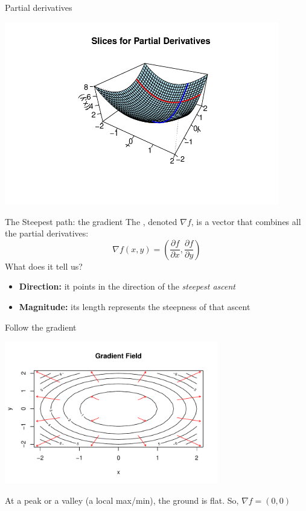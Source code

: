 \documentclass[aspectratio=169]{beamer}\usepackage[]{graphicx}\usepackage[]{xcolor}
\newenvironment{knitrout}{}{} %
\begin{document}
\begin{frame}[fragile]{Partial derivatives}
  \begin{center}
\begin{knitrout}
\color{fgcolor}
\includegraphics[width=0.9\textwidth]{FIGS/L04-fig_partials-1} 
\end{knitrout}
\end{center}
\end{frame}

\begin{frame}{The Steepest path: the gradient}
  The , denoted $\nabla f$, is a vector that combines all the partial derivatives:
  $$ \nabla f(x, y) = \left( \frac{\partial f}{\partial x}, \frac{\partial f}{\partial y} \right) $$
  What does it tell us?
  \begin{itemize}
    \item \textbf{Direction:} it points in the direction of the \textit{steepest ascent}
    \item \textbf{Magnitude:} its length represents the steepness of that ascent
  \end{itemize}
\end{frame}

\begin{frame}[fragile]{Follow the gradient}
  \begin{center}
\begin{knitrout}
\color{fgcolor}
\includegraphics[width=0.7\textwidth]{FIGS/L04-fig_gradient-1} 
\end{knitrout}
\end{center}
At a peak or a valley (a local max/min), the ground is flat. So, $\nabla f = (0, 0)$
\end{frame}
\end{document}
